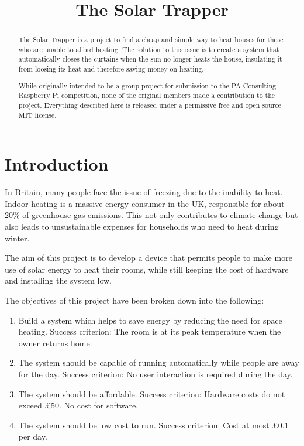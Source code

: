 \documentclass[a4paper,12pt]{article}
\title{The Solar Trapper}
\begin{document}
\maketitle
\begin{abstract}
    The Solar Trapper is a project to find a cheap and simple way to heat houses for those who are unable to afford heating. 
    The solution to this issue is to create a system that automatically closes the curtains when the sun no longer heats the house, 
    insulating it from loosing its heat and therefore saving money on heating.

    While originally intended to be a group project for submission to the PA Consulting Raspberry Pi competition, 
    none of the original members made a contribution to the project.
    Everything described here is released\cite{url:repo} under a permissive free and open source MIT license.
\end{abstract}
\tableofcontents
\section{Introduction}

In Britain, many people face the issue of freezing due to the inability to heat. 
Indoor heating is a massive energy consumer in the UK, responsible for about 20\% of greenhouse gas emissions\cite{url:energyUse}. 
This not only contributes to climate change but also leads to unsustainable expenses for households who need to heat during winter.

The aim of this project is to develop a device that permits people to make more use of solar energy to heat their rooms, 
while still keeping the cost of hardware and installing the system low. 

The objectives of this project have been broken down into the following:

\begin{enumerate}
    \item Build a system which helps to save energy by reducing the need for space heating. Success criterion: The room is at its peak temperature when the owner returns home.
    \item The system should be capable of running automatically while people are away for the day. Success criterion: No user interaction is required during the day.
    \item The system should be affordable. Success criterion: Hardware costs do not exceed £50. No cost for software.
    \item The system should be low cost to run. Success criterion: Cost at most £0.1 per day.
\end{enumerate}
\end{document}
